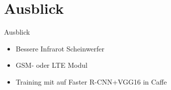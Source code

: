 \section[\thesection \  Ausblick]{Ausblick}\label{sec:conclusion}

\begin{frame}{Ausblick}

        \begin{itemize}
            \item Bessere Infrarot Scheinwerfer
            \item GSM- oder LTE Modul
        \end{itemize}
        \begin{itemize}
            \item Training mit auf Faster R-CNN+VGG16 in Caffe 
        \end{itemize}

\end{frame}
